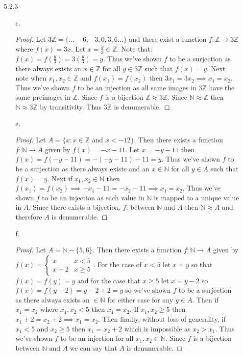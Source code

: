 \documentclass[11pt]{amsart}
\theoremstyle{definition}
\begin{document}
\begin{itemize}
\begin{itemize}
\end{itemize}

\item[5.2.3]
\begin{itemize}
	\item[c.] \begin{proof}
		Let $3\mathbb{Z}=\{\ldots-6,-3,0,3,6\ldots\}$ and there exist a function $f:\mathbb{Z}\to3\mathbb{Z}$ where $f(x)=3x$. Let $x=\frac y3\in\mathbb{Z}$. Note that: $f(x)=f(\frac y3)=3(\frac y3)=y$. Thus we've shown $f$ to be a surjection as there always exists an $x\in\mathbb{Z}$ for all $y\in3\mathbb{Z}$ such that $f(x)=y$. Next note when $x_1,x_2\in\mathbb{Z}$ and $f(x_1)=f(x_2)$ then $3x_1=3x_2\implies x_1=x_2$. Thus we've shown $f$ to be an injection as all same images in $3\mathbb{Z}$ have the same preimages in $\mathbb{Z}$. Since $f$ is a bijection $\mathbb{Z}\approx3\mathbb{Z}$. Since $\mathbb{N}\approx\mathbb{Z}$ then $\mathbb{N}\approx3\mathbb{Z}$ by transitivity. Thus $3\mathbb{Z}$ is denumerable.
	\end{proof}

	\item[e.] \begin{proof}
		Let $A=\{x:x\in\mathbb{Z}\text{ and }x<-12\}$. Then there exists a function $f:\mathbb{N}\to A$ given by $f(x)=-x-11$. Let $x=-y-11$ then $f(x)=f(-y-11)=-(-y-11)-11=y$. Thus we've shown $f$ to be a surjection as there always exists and an $x\in\mathbb{N}$ for all $y\in A$ such that $f(x)=y$. Next if $x_1,x_2\in\mathbb{N}$ then $f(x_1)=f(x_2)\implies-x_1-11=-x_2-11\implies x_1=x_2$. Thus we've shown $f$ to be an injection as each value in $\mathbb{N}$ is mapped to a unique value in $A$. Since there exists a bijection, $f$, between $\mathbb{N}$ and $A$ then $\mathbb{N}\approx A$ and therefore $A$ is denumerable.
	\end{proof}

	\item[f.] \begin{proof}
	 Let $A=\mathbb{N}-\{5,6\}$. Then there exists a function $f:\mathbb{N}\to A$ given by $f(x)=
		\begin{cases}
			x &x<5\\
			x+2 &x\ge 5
		\end{cases}$. For the case of $x<5$ let $x=y$ so that $f(x)=f(y)=y$ and for the case that $x\ge5$ let $x=y-2$ so $f(x)=f(y-2)=y-2+2=y$ so we've shown $f$ to be a surjection as there always exists an $\in\mathbb{N}$ for either case for any $y\in A$. Then if $x_1=x_2$ where $x_1,x_2<5$ then $x_1=x_2$. If $x_1,x_2\ge5$ then $x_1+2=x_2+2\implies x_1=x_2$. Then finally, without loss of generality, if $x_1<5$ and $x_2\ge5$ then $x_1=x_2+2$ which is impossible as $x_2>x_1$. Thus we've shown $f$ to be an injection for all $x_1,x_2\in\mathbb{N}$. Since $f$ is a bijection between $\mathbb{N}$ and $A$ we can say that $A$ is denumerable.
	\end{proof}


\end{itemize}
\end{itemize}
\end{document}
